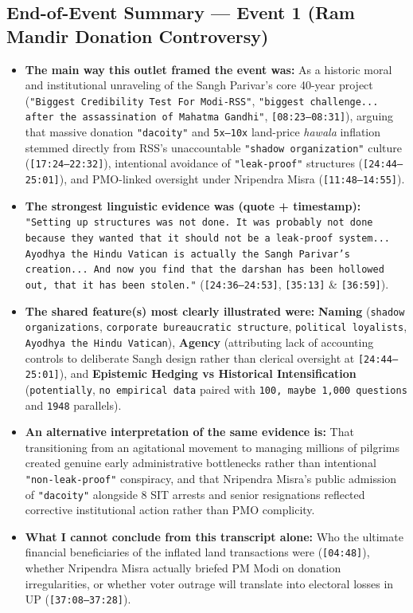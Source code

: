 \documentclass[10pt,a4paper]{article}
\begin{document}
\subsection*{End-of-Event Summary --- Event 1 (Ram Mandir Donation Controversy)}
\begin{itemize}[leftmargin=1.5em, itemsep=3pt, topsep=4pt]
  \item \textbf{The main way this outlet framed the event was:} As a historic moral and institutional unraveling of the Sangh Parivar's core 40-year project (\texttt{"Biggest Credibility Test For Modi-RSS"}, \texttt{"biggest challenge... after the assassination of Mahatma Gandhi"}, \texttt{[08:23--08:31]}), arguing that massive donation \texttt{"dacoity"} and \texttt{5x--10x} land-price \textit{hawala} inflation stemmed directly from RSS's unaccountable \texttt{"shadow organization"} culture (\texttt{[17:24--22:32]}), intentional avoidance of \texttt{"leak-proof"} structures (\texttt{[24:44--25:01]}), and PMO-linked oversight under Nripendra Misra (\texttt{[11:48--14:55]}).
  \item \textbf{The strongest linguistic evidence was (quote + timestamp):} \texttt{"Setting up structures was not done. It was probably not done because they wanted that it should not be a leak-proof system... Ayodhya the Hindu Vatican is actually the Sangh Parivar's creation... And now you find that the darshan has been hollowed out, that it has been stolen."} (\texttt{[24:36--24:53]}, \texttt{[35:13]} \& \texttt{[36:59]}).
  \item \textbf{The shared feature(s) most clearly illustrated were:} \textbf{Naming} (\texttt{shadow organizations}, \texttt{corporate bureaucratic structure}, \texttt{political loyalists}, \texttt{Ayodhya the Hindu Vatican}), \textbf{Agency} (attributing lack of accounting controls to deliberate Sangh design rather than clerical oversight at \texttt{[24:44--25:01]}), and \textbf{Epistemic Hedging vs Historical Intensification} (\texttt{potentially}, \texttt{no empirical data} paired with \texttt{100, maybe 1,000 questions} and \texttt{1948} parallels).
  \item \textbf{An alternative interpretation of the same evidence is:} That transitioning from an agitational movement to managing millions of pilgrims created genuine early administrative bottlenecks rather than intentional \texttt{"non-leak-proof"} conspiracy, and that Nripendra Misra's public admission of \texttt{"dacoity"} alongside 8 SIT arrests and senior resignations reflected corrective institutional action rather than PMO complicity.
  \item \textbf{What I cannot conclude from this transcript alone:} Who the ultimate financial beneficiaries of the inflated land transactions were (\texttt{[04:48]}), whether Nripendra Misra actually briefed PM Modi on donation irregularities, or whether voter outrage will translate into electoral losses in UP (\texttt{[37:08--37:28]}).
\end{itemize}
\end{document}
